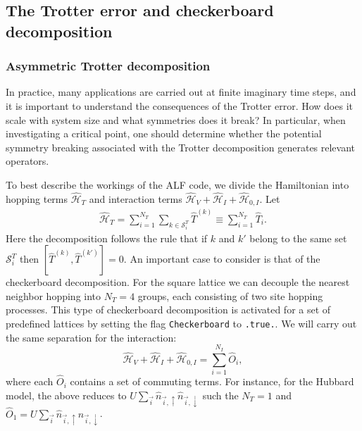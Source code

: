 %



\subsection{The Trotter error and  checkerboard  decomposition }\label{sec:trotter}
%

\subsubsection{Asymmetric  Trotter decomposition}
In practice, many applications are carried out at finite  imaginary time steps,  and it is important to  understand the consequences of the Trotter error.
How does it scale with system size and  what  symmetries  does it break?
In particular, when investigating a critical point, one should determine whether the potential symmetry breaking  associated  with the Trotter decomposition generates relevant operators.

To best describe the workings of the ALF  code,  we divide the Hamiltonian into  hopping terms  $\hat{\mathcal{H}}_{T}$  and interaction terms  
$\hat{\mathcal{H}}_{V} +  \hat{\mathcal{H}}_{I}   +   \hat{\mathcal{H}}_{0,I} $.       Let 
\begin{align}
\label{Checkerboard.Eq}
	\hat{\mathcal{H}}_{T}     = \sum_{i=1}^{N_T} \sum_{k \in \mathcal{S}^{T}_i} \hat{T}^{(k)}  \equiv \sum_{i=1}^{N_T} \hat{T}_{i}.
\end{align}
Here the decomposition follows the rule  that if $k$ and $k'$  belong to the same set $\mathcal{S}^{T}_i $ then   $ \left[ \hat{T}^{(k)} , \hat{T}^{(k')} \right] = 0 $.  An important case to consider is that of the checkerboard decomposition.
For the square lattice we can decouple the nearest neighbor hopping  into $N_T=4$ groups,  each consisting of two site hopping processes.
This type of checkerboard decomposition is activated for a set  of predefined lattices by setting the flag  \texttt{Checkerboard} to \texttt{.true.}.
We will carry out the same separation for the interaction: 
\begin{equation}
	\hat{\mathcal{H}}_{V}  +  \hat{\mathcal{H}}_{I}   +   \hat{\mathcal{H}}_{0,I}   = \sum_{i=1}^{N_I}  \hat{O}_{i},
\end{equation}
where each $\hat{O}_{i}$  contains a set of commuting terms.  For instance, for the Hubbard model,   the  above reduces to 
$U \sum_{\vec{i}}  \hat{n}_{\vec{i},\uparrow } \hat{n}_{\vec{i},\downarrow }  $    such the $N_T = 1$ and   $ \hat{O}_{1} = U \sum_{\vec{i}}  \hat{n}_{\vec{i},\uparrow } \hat{n}_{\vec{i},\downarrow }   $. 

